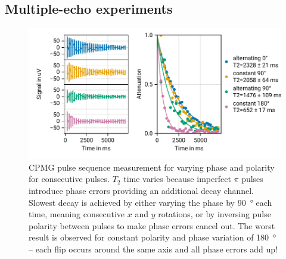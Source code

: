 \documentclass[
    parskip=half, 
    twoside=false,
    twocolumn=true,
    fontsize=11pt,
]{scrarticle}
\begin{document}


\subsection{Multiple-echo experiments}
\begin{figure}
    \centering
    \includegraphics{figures/05 CPMG.pdf}
    \caption{CPMG pulse sequence measurement for varying phase and polarity for consecutive pulses. $T_2$ time varies because imperfect $\pi$ pulses introduce phase errors providing an additional decay channel. Slowest decay is achieved by either varying the phase by \SI{90}{\degree} each time, meaning consecutive $x$ and $y$ rotations, or by inversing pulse polarity between pulses to make phase errors cancel out. The worst result is observed for constant polarity and phase variation of \SI{180}{\degree} -- each flip occurs around the same axis and all phase errors add up!}
    \label{fig:CPMG}
\end{figure}
\end{document}
